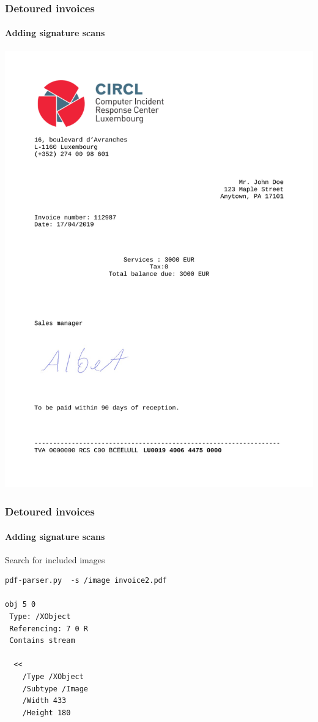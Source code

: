 \begin{frame}[fragile]
    \frametitle{Detoured invoices}
    \framesubtitle{Adding signature scans}
    \begin{center}
        \includegraphics[scale=0.15]{samples/invoice2.pdf}
    \end{center}
\end{frame}


\begin{frame}[fragile]
    \frametitle{Detoured invoices}
    \framesubtitle{Adding signature scans}
    Search for included images
    \begin{lstlisting}
pdf-parser.py  -s /image invoice2.pdf

obj 5 0
 Type: /XObject
 Referencing: 7 0 R
 Contains stream

  <<
    /Type /XObject
    /Subtype /Image
    /Width 433
    /Height 180
    \end{lstlisting}
\end{frame}


